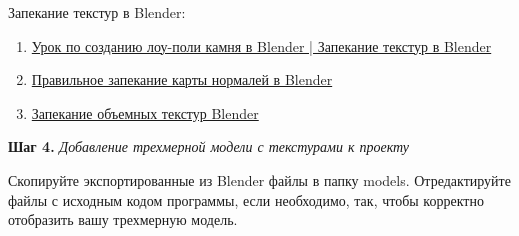 \documentclass[a4paper,12pt]{article}
\begin{document}
    Запекание текстур в Blender:
    \begin{enumerate}
        
        \item \href{https://www.youtube.com/watch?v=mTWtVzgYyHE}{Урок по созданию лоу-поли камня в Blender | Запекание текстур в Blender}
        \item \href{https://www.youtube.com/watch?v=6f3Xdy_q7Bs}{Правильное запекание карты нормалей в Blender}
        \item \href{https://www.youtube.com/watch?v=R0KfJwV72dQ}{Запекание объемных текстур Blender}
    \end{enumerate}

    \textbf{Шаг 4.} \textit{Добавление трехмерной модели с текстурами к проекту}

    Скопируйте экспортированные из Blender файлы в папку \textquotedbl models\textquotedbl.
    Отредактируйте файлы с исходным кодом программы, если необходимо, так, чтобы корректно отобразить вашу трехмерную модель.
    
\end{document}
